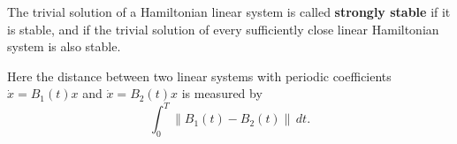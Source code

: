 The trivial solution of a Hamiltonian linear system is called \textbf{strongly stable} if it is stable, and if the trivial solution of every sufficiently close linear Hamiltonian system is also stable.

Here the distance between two linear systems with periodic coefficients $\dot{x} = B_1(t)x$ and $\dot{x} = B_2(t)x$ is measured by
$$\int_0^T \|B_1(t) - B_2(t)\| \, dt.$$
